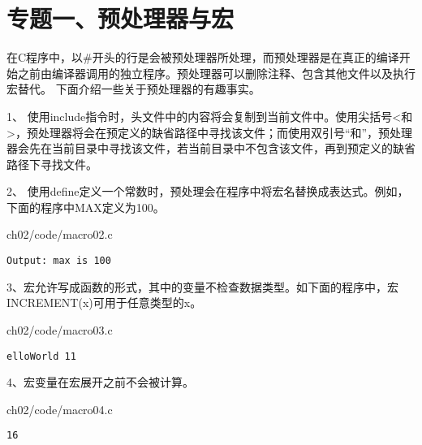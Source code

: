 \section{专题一、预处理器与宏}
\begin{frame}\ft{\secname}
在C程序中，以{\tf \#}开头的行是会被预处理器所处理，而预处理器是在真正的编译开始之前由编译器调用的独立程序。预处理器可以删除注释、包含其他文件以及执行宏替代。 下面介绍一些关于预处理器的有趣事实。
\end{frame}

\begin{frame}\ft{\secname}
1、 使用include指令时，头文件中的内容将会复制到当前文件中。使用尖括号{\tf <}和{\tf >}，预处理器将会在预定义的缺省路径中寻找该文件；而使用双引号“和”，预处理器会先在当前目录中寻找该文件，若当前目录中不包含该文件，再到预定义的缺省路径下寻找文件。
\end{frame}

\begin{frame}[fragile]\ft{\secname}
2、 使用define定义一个常数时，预处理会在程序中将宏名替换成表达式。例如，下面的程序中MAX定义为100。
\end{frame}

\begin{frame}[fragile]\ft{\secname}

{ch02/code/macro02.c}
\pause
\begin{lstlisting}[backgroundcolor=\color{red!10}]
Output: max is 100
\end{lstlisting}

\end{frame}

\begin{frame}[fragile]\ft{\secname}
3、宏允许写成函数的形式，其中的变量不检查数据类型。如下面的程序中，宏{\tf INCREMENT(x)}可用于任意类型的{\tf x}。
\end{frame}

\begin{frame}[fragile]\ft{\secname}

{ch02/code/macro03.c}
\pause
\begin{lstlisting}[backgroundcolor=\color{red!10}]
elloWorld 11
\end{lstlisting}
\end{frame}

\begin{frame}[fragile]\ft{\secname}
4、宏变量在宏展开之前不会被计算。
\end{frame}

\begin{frame}[fragile]\ft{\secname}

{ch02/code/macro04.c}
\pause 
\begin{lstlisting}[backgroundcolor=\color{red!10}]
16
\end{lstlisting}
\end{frame}

